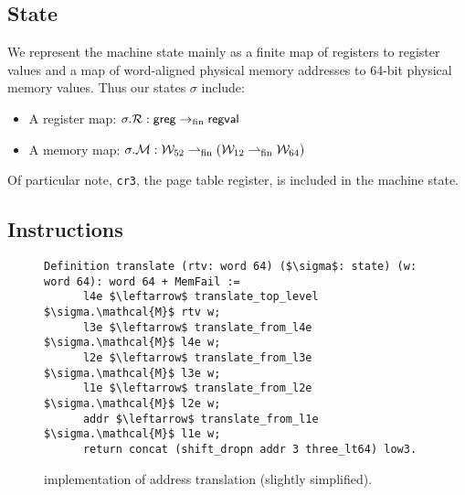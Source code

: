 \subsection{State}
\label{sec:state}
We represent the machine state mainly as a finite map of registers to register values and a map of word-aligned physical memory addresses 
to 64-bit physical memory values. 
Thus our states $\sigma$ include:
\begin{itemize}
\item A register map: $\sigma.\mathcal{R}: \mathsf{greg} \rightarrow_{\textrm{fin}} \mathsf{regval} $
\item A memory map: $\sigma.\mathcal{M}: \mathcal{W}_{52} \rightharpoonup_{\textrm{fin}} (\mathcal{W}_{12} \rightharpoonup_{\textrm{fin}} \mathcal{W}_{64} )$
\end{itemize}
Of particular note, \texttt{cr3}, the page table register, is included in the machine state.
\subsection{Instructions}
\label{sec:instructions}

\begin{figure}[t]
\begin{lstlisting}[language=Coq,mathescape]
 Definition translate (rtv: word 64) ($\sigma$: state) (w: word 64): word 64 + MemFail :=
      l4e $\leftarrow$ translate_top_level $\sigma.\mathcal{M}$ rtv w; 
      l3e $\leftarrow$ translate_from_l4e $\sigma.\mathcal{M}$ l4e w; 
      l2e $\leftarrow$ translate_from_l3e $\sigma.\mathcal{M}$ l3e w;
      l1e $\leftarrow$ translate_from_l2e $\sigma.\mathcal{M}$ l2e w;
      addr $\leftarrow$ translate_from_l1e $\sigma.\mathcal{M}$ l1e w;
      return concat (shift_dropn addr 3 three_lt64) low3.
\end{lstlisting}
\vspace{-1em}
\caption{\coq implementation of address translation (slightly simplified).}
\label{fig:coq_addr_translation}
\end{figure}

